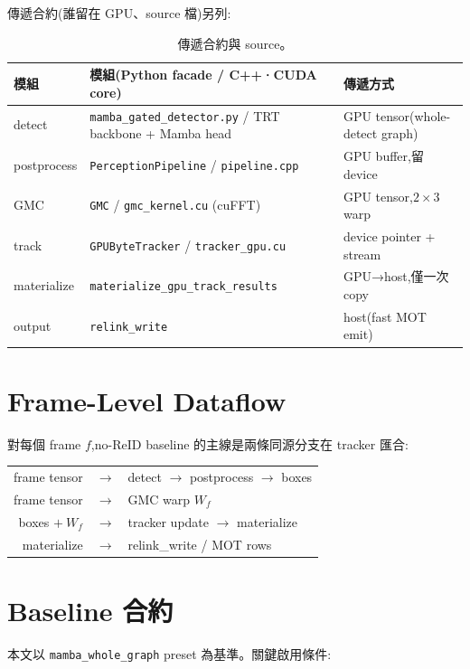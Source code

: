 傳遞合約(誰留在 GPU、source 檔)另列:

\begin{table}[h]\small\setlength{\tabcolsep}{4pt}\renewcommand{\arraystretch}{1.2}
\begin{tabularx}{\linewidth}{@{}l
  >{\raggedright\arraybackslash}X
  >{\raggedright\arraybackslash}X@{}}
\toprule
模組 & 模組(Python facade / C++·CUDA core) & 傳遞方式 \\
\midrule
detect      & \texttt{mamba\_gated\_detector.py} / TRT backbone + Mamba head & GPU tensor(whole-detect graph)\\
postprocess & \texttt{PerceptionPipeline} / \texttt{pipeline.cpp} & GPU buffer,留 device \\
GMC         & \texttt{GMC} / \texttt{gmc\_kernel.cu} (cuFFT)       & GPU tensor,$2\times3$ warp \\
track       & \texttt{GPUByteTracker} / \texttt{tracker\_gpu.cu}   & device pointer + stream \\
materialize & \texttt{materialize\_\allowbreak gpu\_\allowbreak track\_\allowbreak results} & GPU→host,僅一次 copy \\
output      & \texttt{relink\_write}                               & host(fast MOT emit)\\
\bottomrule
\end{tabularx}
\caption{傳遞合約與 source。}\label{tab:transfer}
\end{table}

\section{Frame-Level Dataflow}\label{sec:dataflow}
對每個 frame \(f\),no-ReID baseline 的主線是兩條同源分支在 tracker 匯合:
\begin{center}
\small
\begin{tabular}{@{}rcl@{}}
frame tensor & \(\to\) & detect \(\to\) postprocess \(\to\) boxes \\
frame tensor & \(\to\) & GMC warp \(W_f\) \\
boxes \(+\ W_f\) & \(\to\) & tracker update \(\to\) materialize \\
materialize & \(\to\) & relink\_write / MOT rows
\end{tabular}
\end{center}

\section{Baseline 合約}\label{sec:baseline}
本文以 \texttt{mamba\_whole\_graph} preset 為基準。關鍵啟用條件:

